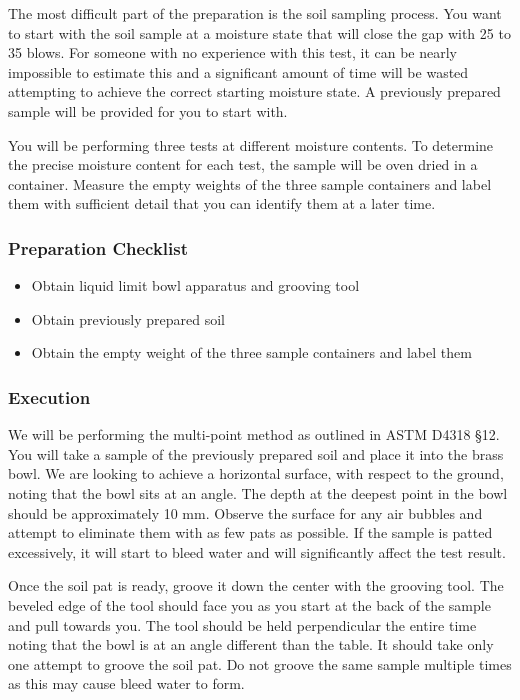 \documentclass[12pt]{article}
\begin{document}
The most difficult part of the preparation is the soil sampling process. You want to start with the soil sample at a moisture state that will close the gap with 25 to 35 blows. For someone with no experience with this test, it can be nearly impossible to estimate this and a significant amount of time will be wasted attempting to achieve the correct starting moisture state. A previously prepared sample will be provided for you to start with.

You will be performing three tests at different moisture contents. To determine the precise moisture content for each test, the sample will be oven dried in a container. Measure the empty weights of the three sample containers and label them with sufficient detail that you can identify them at a later time.

\subsubsection*{Preparation Checklist}
\begin{itemize}
    \item Obtain liquid limit bowl apparatus and grooving tool
    \item Obtain previously prepared soil
    \item Obtain the empty weight of the three sample containers and label them
\end{itemize}

\subsubsection{Execution}
We will be performing the multi-point method as outlined in ASTM D4318 \S12. You will take a sample of the previously prepared soil and place it into the brass bowl. We are looking to achieve a horizontal surface, with respect to the ground, noting that the bowl sits at an angle. The depth at the deepest point in the bowl should be approximately 10 mm. Observe the surface for any air bubbles and attempt to eliminate them with as few pats as possible. If the sample is patted excessively, it will start to bleed water and will significantly affect the test result.

Once the soil pat is ready, groove it down the center with the grooving tool. The beveled edge of the tool should face you as you start at the back of the sample and pull towards you. The tool should be held perpendicular the entire time noting that the bowl is at an angle different than the table. It should take only one attempt to groove the soil pat. Do not groove the same sample multiple times as this may cause bleed water to form.
\end{document}
